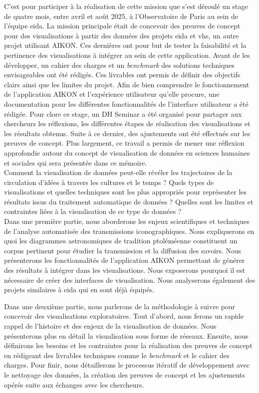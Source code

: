 \documentclass[a4paper,12pt,twoside]{book}
\begin{document}
	C'est pour participer à la réalisation de cette mission que s'est déroulé un stage de quatre mois, entre avril et août 2025, à l'Observatoire de Paris au sein de l'équipe \gls{eida}. La mission principale était de concevoir des preuves de concept pour des visualisations à partir des données des projets \gls{eida} et \gls{vhs}, un autre projet utilisant AIKON. Ces dernières ont pour but de tester la faisabilité et la pertinence des visualisations à intégrer au sein de cette application. Avant de les développer, un cahier des charges et un \textit{benchmark} des solutions techniques envisageables ont été rédigés. Ces livrables ont permis de définir des objectifs clairs ainsi que les limites du projet. Afin de bien comprendre le fonctionnement de l’application AIKON et l’expérience utilisateur qu’elle procure, une documentation pour les différentes fonctionnalités de l’interface utilisateur a été rédigée. Pour clore ce stage, un DH Seminar a été organisé pour partager aux chercheurs les réflexions, les différentes étapes de réalisation des visualisations et les résultats obtenus. Suite à ce dernier, des ajustements ont été effectués sur les preuves de concept. Plus largement, ce travail a permis de mener une réflexion approfondie autour du concept de visualisation de données en sciences humaines et sociales qui sera présentée dans ce mémoire.\\
	
	Comment la visualisation de données peut-elle révéler les trajectoires de la circulation d'idées à travers les cultures et le temps ? Quels types de visualisations et quelles techniques sont les plus appropriés pour représenter les résultats issus du traitement automatique de données ? Quelles sont les limites et contraintes liées à la visualisation de ce type de données ?\\
	
	Dans une première partie, nous aborderons les enjeux scientifiques et techniques de l'analyse automatisée des transmissions iconographiques. Nous expliquerons en quoi les diagrammes astronomiques de tradition ptoléméenne constituent un corpus pertinent pour étudier la transmission et la diffusion des savoirs. Nous présenterons les fonctionnalités de l'application AIKON permettant de générer des résultats à intégrer dans les visualisations. Nous exposerons pourquoi il est nécessaire de créer des interfaces de visualisation. Nous analyserons également des projets similaires à \gls{eida} qui en sont déjà équipés. 
	
	Dans une deuxième partie, nous parlerons de la méthodologie à suivre pour concevoir des visualisations exploratoires. Tout d'abord, nous ferons un rapide rappel de l'histoire et des enjeux de la visualisation de données. Nous présenterons plus en détail la visualisation sous forme de réseaux. Ensuite, nous définirons les besoins et les contraintes pour la réalisation des preuves de concept en rédigeant des livrables techniques comme le \textit{benchmark} et le cahier des charges. Pour finir, nous détaillerons le processus itératif de développement avec le nettoyage des données, la création des preuves de concept et les ajustements opérés suite aux échanges avec les chercheurs. 
	
\end{document}
